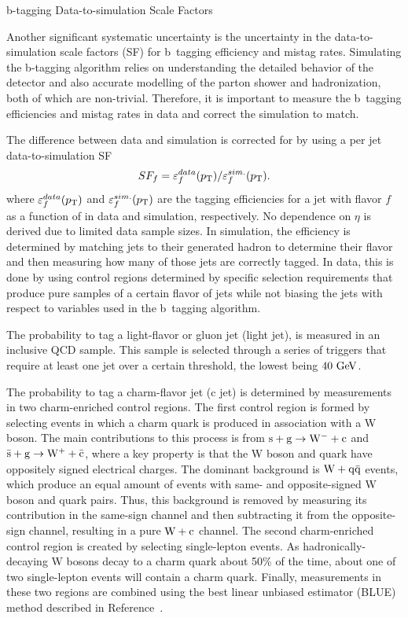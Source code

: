 \begin{section}{b-tagging Data-to-simulation Scale Factors}

Another significant systematic uncertainty is the uncertainty in the data-to-simulation scale factors (SF) for b~tagging efficiency and mistag rates.
Simulating the b-tagging algorithm relies on understanding the detailed behavior of the detector and also accurate modelling of the parton shower and hadronization, both of which are non-trivial.
Therefore, it is important to measure the b~tagging efficiencies and mistag rates in data and correct the simulation to match.

The difference between data and simulation is corrected for by using a per jet data-to-simulation SF
\begin{align}
SF_{f} = \varepsilon^{data}_{f}(p_{\mathrm{T}})/\varepsilon^{sim.}_{f}(p_{\mathrm{T}}).
\end{align}
where $\varepsilon^{data}_{f}(p_{\mathrm{T}})$ and $\varepsilon^{sim.}_{f}(p_{\mathrm{T}})$ are the tagging efficiencies for a jet with flavor $f$ as a function of \pT in data and simulation, respectively.
No dependence on $\eta$ is derived due to limited data sample sizes.
In simulation, the efficiency is determined by matching jets to their generated hadron to determine their flavor and then measuring how many of those jets are correctly tagged.
In data, this is done by using control regions determined by specific selection requirements that produce pure samples of a certain flavor of jets while not biasing the jets with respect to variables used in the b~tagging algorithm.

The probability to tag a light-flavor or gluon jet (light jet), is measured in an inclusive QCD sample.
This sample is selected through a series of triggers that require at least one jet over a certain \pT threshold, the lowest being $40~\mathrm{Ge\kern -0.1em V}$.

The probability to tag a charm-flavor jet (c jet) is determined by measurements in two charm-enriched control regions.
The first control region is formed by selecting events in which a charm quark is produced in association with a W boson.
The main contributions to this process is from $\mathrm{s} + \mathrm{g} \to \mathrm{W^{-}} + \mathrm{c}$ and $\mathrm{\bar{s}} + \mathrm{g} \to \mathrm{W^{+}} + \mathrm{\bar{c}}$, where a key property is that the W boson and quark have oppositely signed electrical charges.
The dominant background is $\mathrm{W} + \mathrm{q\bar{q}}$ events, which produce an equal amount of events with same- and opposite-signed W boson and quark pairs.
Thus, this background is removed by measuring its contribution in the same-sign channel and then subtracting it from the opposite-sign channel, resulting in a pure $\mathrm{W} + \mathrm{c}$ channel.
The second charm-enriched control region is created by selecting single-lepton \ttbar events.
As hadronically-decaying W bosons decay to a charm quark about 50\% of the time, about one of two single-lepton \ttbar events will contain a charm quark.
Finally, measurements in these two regions are combined using the best linear unbiased estimator (BLUE) method described in Reference~\cite{LYONS1988110}.


\end{section}
